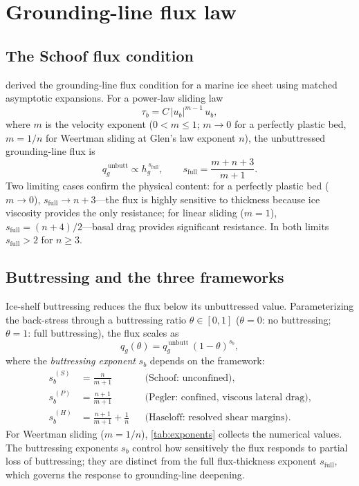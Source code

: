 \documentclass[11pt]{article}
\newcommand{\qg}{q_g}
\newcommand{\hg}{h_g}
\begin{document}
\section{Grounding-line flux law}
\label{sec:flux_law}

\subsection{The Schoof flux condition}

\citet{Schoof2007} derived the grounding-line flux condition for a marine ice sheet using matched asymptotic expansions. For a power-law sliding law
\begin{equation}
	\tau_b = C\,|u_b|^{m-1}\,u_b,
	\label{eq:sliding_law}
\end{equation}
where $m$ is the velocity exponent ($0 < m \leq 1$; $m \to 0$ for a perfectly plastic bed, $m = 1/n$ for Weertman sliding at Glen's law exponent $n$), the unbuttressed grounding-line flux is
\begin{equation}
	\qg^{\,\mathrm{unbutt}} \propto \hg^{\,s_{\mathrm{full}}},
	\qquad
	s_{\mathrm{full}} = \frac{m + n + 3}{m + 1}.
	\label{eq:s_full}
\end{equation}
Two limiting cases confirm the physical content: for a perfectly plastic bed ($m \to 0$), $s_{\mathrm{full}} \to n + 3$---the flux is highly sensitive to thickness because ice viscosity provides the only resistance; for linear sliding ($m = 1$), $s_{\mathrm{full}} = (n+4)/2$---basal drag provides significant resistance. In both limits $s_{\mathrm{full}} > 2$ for $n \geq 3$.

\subsection{Buttressing and the three frameworks}

Ice-shelf buttressing reduces the flux below its unbuttressed value. Parameterizing the back-stress through a buttressing ratio $\theta \in [0,1]$ ($\theta = 0$: no buttressing; $\theta = 1$: full buttressing), the flux scales as
\begin{equation}
	\qg(\theta) = \qg^{\,\mathrm{unbutt}}\,(1 - \theta)^{s_b},
	\label{eq:buttressed_flux}
\end{equation}
where the \emph{buttressing exponent} $s_b$ depends on the framework:
\begin{align}
	s_b^{\,(S)} &= \frac{n}{m+1} && \text{(Schoof: unconfined)}, \label{eq:sb_schoof} \\
	s_b^{\,(P)} &= \frac{n+1}{m+1} && \text{(Pegler: confined, viscous lateral drag)}, \label{eq:sb_pegler} \\
	s_b^{\,(H)} &= \frac{n+1}{m+1} + \frac{1}{n} && \text{(Haseloff: resolved shear margins)}. \label{eq:sb_haseloff}
\end{align}
For Weertman sliding ($m = 1/n$), \cref{tab:exponents} collects the numerical values. The buttressing exponents $s_b$ control how sensitively the flux responds to partial loss of buttressing; they are distinct from the full flux-thickness exponent $s_{\mathrm{full}}$, which governs the response to grounding-line deepening.
\end{document}
